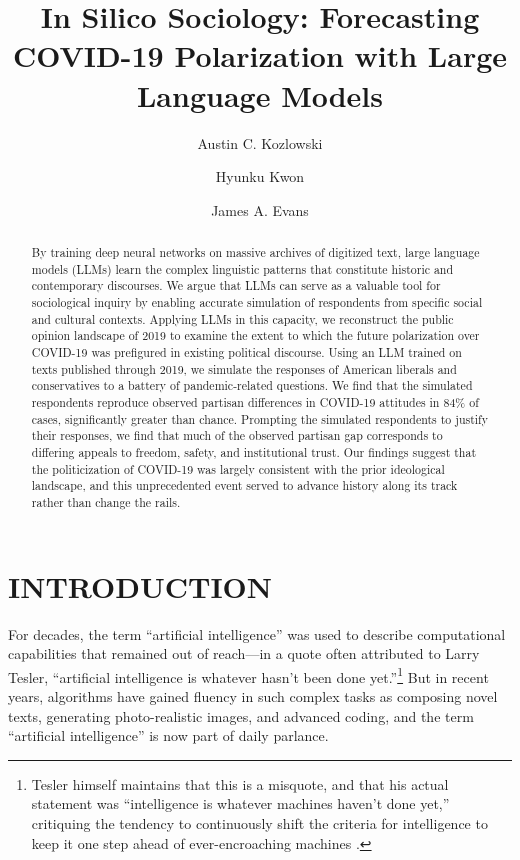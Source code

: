 \documentclass{article}
\title{In Silico Sociology: Forecasting COVID-19 Polarization with Large Language Models}
\author[1]{Austin C. Kozlowski\orcidA{}}
\author[2]{Hyunku Kwon\orcidB{}}
\author[3]{James A. Evans\orcidC{}}
\affil[1, 2, 3]{Department of Sociology, University of Chicago}
\affil[3]{Santa Fe Institute}
\begin{document}
  \maketitle

  \begin{abstract}
    By training deep neural networks on massive archives of digitized text,
    large language models (LLMs) learn the complex linguistic patterns that
    constitute historic and contemporary discourses. We argue that LLMs can
    serve as a valuable tool for sociological inquiry by enabling accurate
    simulation of respondents from specific social and cultural contexts.
    Applying LLMs in this capacity, we reconstruct the public opinion
    landscape of 2019 to examine the extent to which the future polarization
    over COVID-19 was prefigured in existing political discourse. Using an
    LLM trained on texts published through 2019, we simulate the responses
    of American liberals and conservatives to a battery of pandemic-related
    questions. We find that the simulated respondents reproduce observed
    partisan differences in COVID-19 attitudes in 84\% of cases,
    significantly greater than chance. Prompting the simulated respondents
    to justify their responses, we find that much of the observed partisan
    gap corresponds to differing appeals to freedom, safety, and
    institutional trust. Our findings suggest that the politicization of
    COVID-19 was largely consistent with the prior ideological landscape,
    and this unprecedented event served to advance history along its track
    rather than change the rails.
  \end{abstract}
  \vspace{0.35cm}

\section*{INTRODUCTION}

For decades, the term ``artificial intelligence'' was used to describe
computational capabilities that remained out of reach---in a quote often
attributed to Larry Tesler, ``artificial intelligence is whatever hasn't
been done yet.''\footnote{Tesler himself maintains that this is a
  misquote, and that his actual statement was ``intelligence is whatever
  machines haven't done yet,'' critiquing the tendency
  to continuously shift the criteria for intelligence to keep it one
  step ahead of ever-encroaching machines \parencite{Tesler2010-ty}.} But in
recent years, algorithms have gained fluency in such complex tasks as
composing novel texts, generating photo-realistic images, and advanced
coding, and the term ``artificial intelligence'' is now part of daily
parlance.
\end{document}
